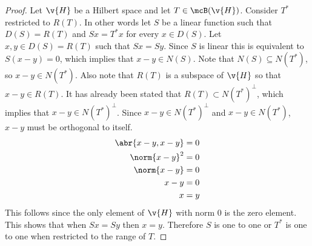 \documentclass[11pt, oneside]{article}
\begin{document}
\begin{enumerate}
    \begin{proof}
      Let $\v{H}$ be a Hilbert space and let $T \in \mcB(\v{H})$.
      Consider $T^*$ restricted to $R(T)$.
      In other words let $S$ be a linear function such that $D(S) = R(T)$ and
      $Sx = T^*x$ for every $x \in D(S)$.
      Let $x, y \in D(S) = R(T)$ such that $Sx = Sy$.
      Since $S$ is linear this is equivalent to $S(x - y) = 0$, which implies
      that $x - y \in N(S)$.
      Note that $N(S) \subseteq N(T^*)$, so $x - y \in N(T^*)$.
      Also note that $R(T)$ is a subspace of $\v{H}$ so that $x - y \in R(T)$.
      It has already been stated that $R(T) \subset N(T^*)^{\perp}$, which
      implies that $x - y \in N(T^*)^{\perp}$.
      Since $x - y \in N(T^*)^{\perp}$ and $x - y \in N(T^*)$, $x - y$ must be
      orthogonal to itself.
      \begin{align*}
        \abr{x - y, x - y} &= 0 \\
        \norm{x - y}^2 &= 0 \\
        \norm{x - y} &= 0 \\
        x - y &= 0 \\
        x &= y
      \end{align*}
      This follows since the only element of $\v{H}$ with norm $0$ is the zero
      element.
      This shows that when $Sx = Sy$ then $x = y$.
      Therefore $S$ is one to one or $T^*$ is one to one when restricted to the
      range of $T$.
    \end{proof}
\end{enumerate}
\end{document}
